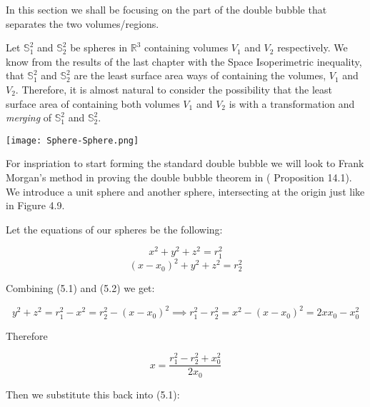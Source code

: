 \documentclass[a4paper,12pt]{report}
\begin{document}
In this section we shall be focusing on the part of the double bubble that separates the two volumes/regions. \newline

Let $\mathbb{S}_{1}^{2}$ and $\mathbb{S}_{2}^{2}$ be spheres in $\mathbb{R}^{3}$ containing volumes $V_{1}$ and $V_{2}$ respectively. We know from the results of the last chapter with the Space Isoperimetric inequality, that $\mathbb{S}_{1}^{2}$ and $\mathbb{S}_{2}^{2}$ are the least surface area ways of containing the volumes, $V_{1}$ and $V_{2}$. Therefore, it is almost natural to consider the possibility that the least surface area of containing both volumes $V_{1}$ and $V_{2}$ is with a transformation and \textit{merging} of $\mathbb{S}_{1}^{2}$ and $\mathbb{S}_{2}^{2}$. 

\begin{center}
\texttt{[image: Sphere-Sphere.png]}
\end{center}

\hspace{-0.66cm}For inspriation to start forming the standard double bubble we will look to Frank Morgan's method in proving the double bubble theorem in (\cite{morgan4} Proposition 14.1). We introduce a unit sphere and another sphere, intersecting at the origin just like in Figure 4.9.\newline

Let the equations of our spheres be the following:

\begin{equation}
x^{2}+y^{2}+z^{2} = r_{1}^{2}
\end{equation}
\vspace{-1cm}
\begin{equation}
(x-x_{0})^{2}+y^{2}+z^{2} = r_{2}^{2}
\end{equation}

Combining (5.1) and (5.2) we get:

\[
y^{2}+z^{2} = r_{1}^{2} - x^{2} = r_{2}^{2} - (x-x_{0})^{2} \implies r_{1}^{2} - r_{2}^{2} = x^{2} - (x-x_{0})^{2} = 2xx_{0}-x_{0}^{2}
\]

Therefore

\begin{equation}
x = \frac{r_{1}^{2}-r_{2}^{2} + x_{0}^{2}}{2x_{0}}
\end{equation}

Then we substitute this back into (5.1):
\end{document}
